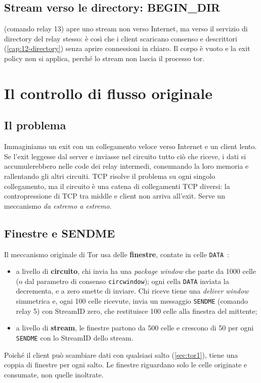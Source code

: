 \subsection{Stream verso le directory: BEGIN\_DIR}

 (comando relay 13) apre uno stream non verso Internet, ma verso il servizio di directory del relay stesso: è così che i client scaricano consenso e descrittori (\cref{cap:12-directory}) senza aprire connessioni in chiaro. Il corpo è vuoto e la exit policy non si applica, perché lo stream non lascia il processo tor.

\section{Il controllo di flusso originale}\label{sec:flusso-classico}

\subsection{Il problema}

Immaginiamo un exit con un collegamento veloce verso Internet e un client lento. Se l'exit leggesse dal server e inviasse nel circuito tutto ciò che riceve, i dati si accumulerebbero nelle code dei relay intermedi, consumando la loro memoria e rallentando gli altri circuiti. TCP risolve il problema su ogni singolo collegamento, ma il circuito è una catena di collegamenti TCP diversi: la contropressione di TCP tra middle e client non arriva all'exit. Serve un meccanismo \emph{da estremo a estremo}.

\subsection{Finestre e SENDME}

Il meccanismo originale di Tor usa delle \textbf{finestre}, contate in celle \texttt{DATA}~:
\begin{itemize}
  \item a livello di \textbf{circuito}, chi invia ha una \emph{package window} che parte da 1000 celle (o dal parametro di consenso \texttt{circwindow}); ogni cella \texttt{DATA} inviata la decrementa, e a zero smette di inviare. Chi riceve tiene una \emph{deliver window} simmetrica e, ogni 100 celle ricevute, invia un messaggio \texttt{SENDME} (comando relay 5) con StreamID zero, che restituisce 100 celle alla finestra del mittente;
  \item a livello di \textbf{stream}, le finestre partono da 500 celle e crescono di 50 per ogni \texttt{SENDME} con lo StreamID dello stream.
\end{itemize}
Poiché il client può scambiare dati con qualsiasi salto (\cref{sec:tor1}), tiene una coppia di finestre per ogni salto. Le finestre riguardano solo le celle originate e consumate, non quelle inoltrate.

